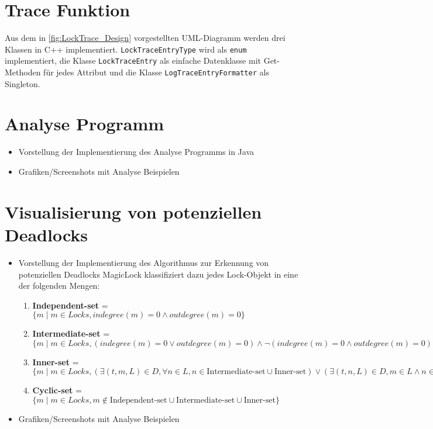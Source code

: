 \section{Trace Funktion}
\label{section:Implementierung:Trace Funktion}
Aus dem in \cref{fig:LockTrace_Design} vorgestellten UML-Diagramm werden drei
Klassen in C++ implementiert. \texttt{LockTraceEntryType} wird als \texttt{enum}
implementiert, die Klasse \texttt{LockTraceEntry} als einfache Datenklasse mit
Get-Methoden für jedes Attribut und die Klasse \texttt{LogTraceEntryFormatter}
als Singleton.


\section{Analyse Programm}
\label{section:Implementierung:Analyse Programm}
\begin{itemize}
  \item Vorstellung der Implementierung des Analyse Programms in Java
  \item Grafiken/Screenshots mit Analyse Beispielen
\end{itemize}

\section{Visualisierung von potenziellen Deadlocks}
\label{section:Implementierung:Visualisierung von potenziellen Deadlocks}
\begin{itemize}
  \item Vorstellung der Implementierung des Algorithmus zur Erkennung von
  potenziellen Deadlocks
  MagicLock klassifiziert dazu jedes Lock-Objekt in eine der folgenden Mengen:
  \begin{enumerate}
    \item \textbf{Independent-set} = $\{m \mid m \in Locks, indegree(m) = 0 \land outdegree(m) = 0\}$
    \item \textbf{Intermediate-set} = $\{m \mid m \in Locks, (indegree(m) = 0 \lor outdegree(m) = 0) \land \lnot (indegree(m) = 0 \land outdegree(m) = 0)\}$
    \item \textbf{Inner-set} = $\{m \mid m \in Locks, (\exists (t,m,L) \in D, \forall n \in L, n \in \text{Intermediate-set} \cup \text{Inner-set}) \lor (\exists (t,n,L) \in D, m \in L \land n \in \text{Intermediate-set} \cup \text{Inner-set})\}$
    \item \textbf{Cyclic-set} = $\{m \mid m \in Locks, m \notin \text{Independent-set} \cup \text{Intermediate-set} \cup \text{Inner-set}\}$
  \end{enumerate}
  \item Grafiken/Screenshots mit Analyse Beispielen
\end{itemize}